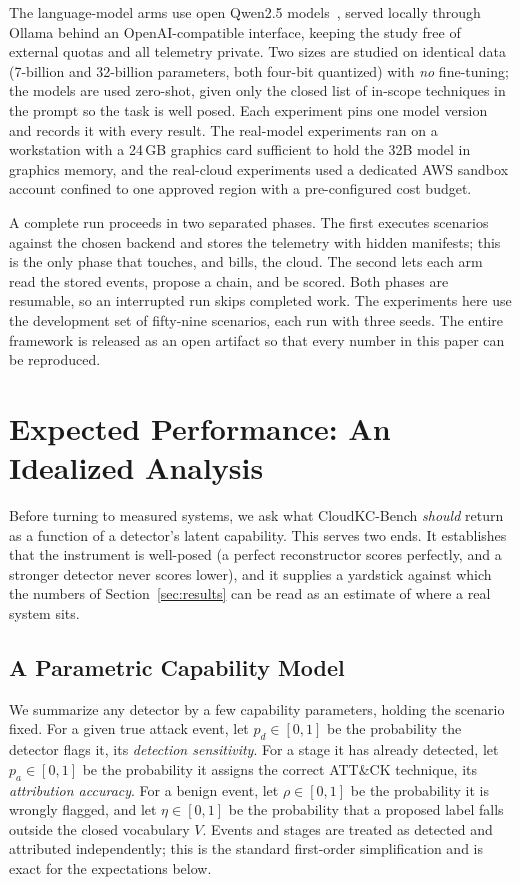 \documentclass[journal]{IEEEtran}
\begin{document}
The language-model arms use open Qwen2.5 models~\cite{qwen}, served locally through Ollama behind an
OpenAI-compatible interface, keeping the study free of external quotas and all telemetry private. Two
sizes are studied on identical data (7-billion and 32-billion parameters, both four-bit
quantized) with \emph{no} fine-tuning; the models are used zero-shot, given only the closed list of
in-scope techniques in the prompt so the task is well posed. Each experiment pins one model version
and records it with every result. The real-model experiments ran on a workstation with a 24\,GB
graphics card sufficient to hold the 32B model in graphics memory, and the real-cloud experiments used
a dedicated AWS sandbox account confined to one approved region with a pre-configured cost budget.

A complete run proceeds in two separated phases. The first executes scenarios against the chosen
backend and stores the telemetry with hidden manifests; this is the only phase that touches, and
bills, the cloud. The second lets each arm read the stored events, propose a chain, and be scored.
Both phases are resumable, so an interrupted run skips completed work. The experiments here use the
development set of fifty-nine scenarios, each run with three seeds. The entire framework is released as
an open artifact so that every number in this paper can be reproduced.

\section{Expected Performance: An Idealized Analysis}\label{sec:expected}
Before turning to measured systems, we ask what CloudKC-Bench \emph{should} return as a function of a
detector's latent capability. This serves two ends. It establishes that the instrument is
well-posed (a perfect reconstructor scores perfectly, and a stronger detector never scores lower), and
it supplies a yardstick against which the numbers of Section~\ref{sec:results} can be read as an estimate
of where a real system sits.

\subsection{A Parametric Capability Model}
We summarize any detector by a few capability parameters, holding the scenario fixed. For a given true
attack event, let $p_d\in[0,1]$ be the probability the detector flags it, its \emph{detection
sensitivity}. For a stage it has already detected, let $p_a\in[0,1]$ be the probability it assigns the
correct ATT\&CK technique, its \emph{attribution accuracy}. For a benign event, let $\rho\in[0,1]$ be
the probability it is wrongly flagged, and let $\eta\in[0,1]$ be the probability that a proposed label
falls outside the closed vocabulary $V$. Events and stages are treated as detected and attributed
independently; this is the standard first-order simplification and is exact for the expectations below.
\end{document}
